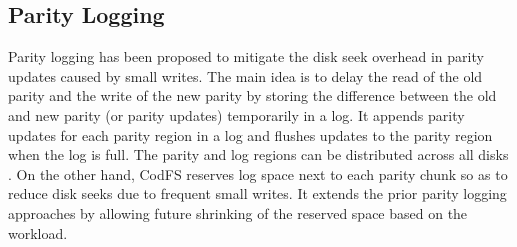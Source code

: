 \subsection{Parity Logging}

Parity logging \cite{chen94,stodolsky93} has been proposed to mitigate the disk
seek overhead in parity updates caused by small writes. The main idea is to
delay the read of the old parity and the write of the new parity by storing the
difference between the old and new parity (or parity updates) temporarily in a
log. It appends parity updates for each parity region in a log and flushes
updates to the parity region when the log is full.  The parity and log regions
can be distributed across all disks \cite{stodolsky93}.  On the other hand,
CodFS reserves log space next to each parity chunk so as to reduce disk seeks
due to frequent small writes.  It extends the prior parity logging approaches by
allowing future shrinking of the reserved space based on the workload. 



